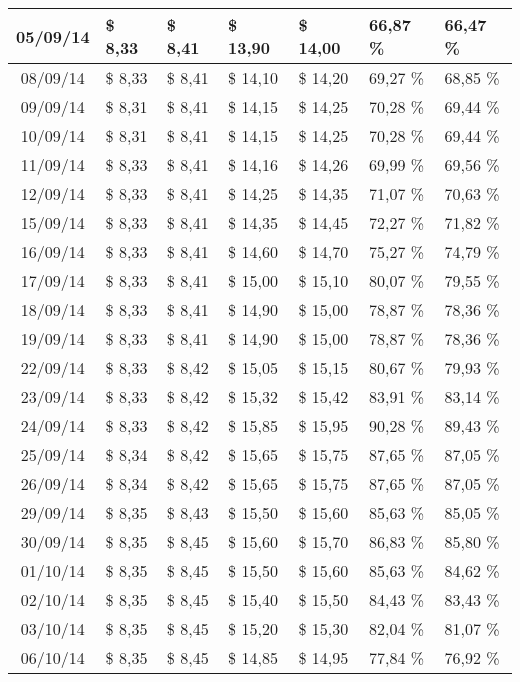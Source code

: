 \begin{center}
\begin{longtable}{|c|p{1.5cm}|p{1.5cm}|p{1.5cm}|p{1.5cm}|p{1.5cm}|p{1.5cm}|}
05/09/14 & \$ 8,33 & \$ 8,41 & \$ 13,90 & \$ 14,00 & 66,87 \% & 66,47 \% \\ \hline
08/09/14 & \$ 8,33 & \$ 8,41 & \$ 14,10 & \$ 14,20 & 69,27 \% & 68,85 \% \\ \hline
09/09/14 & \$ 8,31 & \$ 8,41 & \$ 14,15 & \$ 14,25 & 70,28 \% & 69,44 \% \\ \hline
10/09/14 & \$ 8,31 & \$ 8,41 & \$ 14,15 & \$ 14,25 & 70,28 \% & 69,44 \% \\ \hline
11/09/14 & \$ 8,33 & \$ 8,41 & \$ 14,16 & \$ 14,26 & 69,99 \% & 69,56 \% \\ \hline
12/09/14 & \$ 8,33 & \$ 8,41 & \$ 14,25 & \$ 14,35 & 71,07 \% & 70,63 \% \\ \hline
15/09/14 & \$ 8,33 & \$ 8,41 & \$ 14,35 & \$ 14,45 & 72,27 \% & 71,82 \% \\ \hline
16/09/14 & \$ 8,33 & \$ 8,41 & \$ 14,60 & \$ 14,70 & 75,27 \% & 74,79 \% \\ \hline
17/09/14 & \$ 8,33 & \$ 8,41 & \$ 15,00 & \$ 15,10 & 80,07 \% & 79,55 \% \\ \hline
18/09/14 & \$ 8,33 & \$ 8,41 & \$ 14,90 & \$ 15,00 & 78,87 \% & 78,36 \% \\ \hline
19/09/14 & \$ 8,33 & \$ 8,41 & \$ 14,90 & \$ 15,00 & 78,87 \% & 78,36 \% \\ \hline
22/09/14 & \$ 8,33 & \$ 8,42 & \$ 15,05 & \$ 15,15 & 80,67 \% & 79,93 \% \\ \hline
23/09/14 & \$ 8,33 & \$ 8,42 & \$ 15,32 & \$ 15,42 & 83,91 \% & 83,14 \% \\ \hline
24/09/14 & \$ 8,33 & \$ 8,42 & \$ 15,85 & \$ 15,95 & 90,28 \% & 89,43 \% \\ \hline
25/09/14 & \$ 8,34 & \$ 8,42 & \$ 15,65 & \$ 15,75 & 87,65 \% & 87,05 \% \\ \hline
26/09/14 & \$ 8,34 & \$ 8,42 & \$ 15,65 & \$ 15,75 & 87,65 \% & 87,05 \% \\ \hline
29/09/14 & \$ 8,35 & \$ 8,43 & \$ 15,50 & \$ 15,60 & 85,63 \% & 85,05 \% \\ \hline
30/09/14 & \$ 8,35 & \$ 8,45 & \$ 15,60 & \$ 15,70 & 86,83 \% & 85,80 \% \\ \hline
01/10/14 & \$ 8,35 & \$ 8,45 & \$ 15,50 & \$ 15,60 & 85,63 \% & 84,62 \% \\ \hline
02/10/14 & \$ 8,35 & \$ 8,45 & \$ 15,40 & \$ 15,50 & 84,43 \% & 83,43 \% \\ \hline
03/10/14 & \$ 8,35 & \$ 8,45 & \$ 15,20 & \$ 15,30 & 82,04 \% & 81,07 \% \\ \hline
06/10/14 & \$ 8,35 & \$ 8,45 & \$ 14,85 & \$ 14,95 & 77,84 \% & 76,92 \% \\ \hline

\end{longtable}
\end{center}
